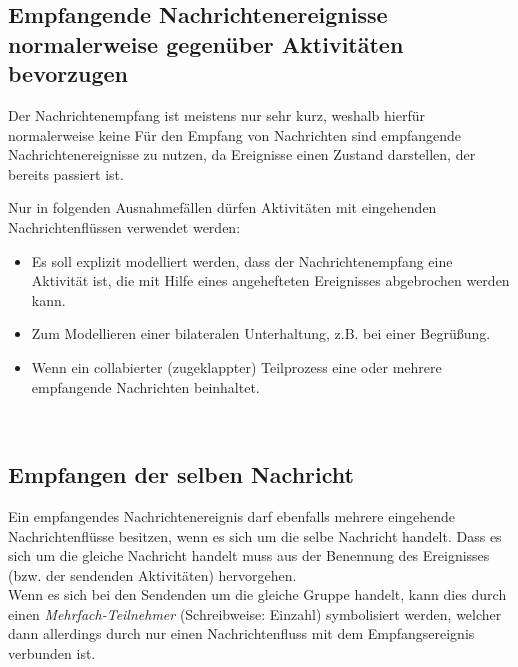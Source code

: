 \documentclass[12pt,report]{snetTeaching}
\begin{document}
\begin{Rahmen}
	\hfill
\end{Rahmen}


\clearpage
\subsection{Empfangende Nachrichtenereignisse normalerweise gegenüber Aktivitäten bevorzugen}
\label{konv:receivingMessageEvents}

Der Nachrichtenempfang ist meistens nur sehr kurz, weshalb hierfür normalerweise keine 
Für den Empfang von Nachrichten sind empfangende Nachrichtenereignisse zu nutzen, da Ereignisse einen Zustand darstellen, der bereits passiert ist.


Nur in folgenden Ausnahmefällen dürfen Aktivitäten mit eingehenden Nachrichtenflüssen verwendet werden:
\begin{itemize}
	\item Es soll explizit modelliert werden, dass der Nachrichtenempfang eine Aktivität ist, die mit Hilfe eines angehefteten Ereignisses abgebrochen werden kann.
	\item Zum Modellieren einer bilateralen Unterhaltung, z.B. bei einer Begrüßung.
	\item Wenn ein collabierter (zugeklappter) Teilprozess eine oder mehrere empfangende Nachrichten beinhaltet. 
\end{itemize}

\begin{Rahmen}
	\hfill
	\\
	\hfill
\end{Rahmen}





\clearpage
\subsection{Empfangen der selben Nachricht}


Ein empfangendes Nachrichtenereignis darf ebenfalls mehrere eingehende Nachrichtenflüsse besitzen, wenn es sich um die selbe Nachricht handelt.
Dass es sich um die gleiche Nachricht handelt muss aus der Benennung des Ereignisses (bzw. der sendenden Aktivitäten) hervorgehen.\\
Wenn es sich bei den Sendenden um die gleiche Gruppe handelt, kann dies durch einen \emph{Mehrfach-Teilnehmer} (Schreibweise: Einzahl) symbolisiert werden, welcher dann allerdings durch nur einen Nachrichtenfluss mit dem Empfangsereignis verbunden ist.
\end{document}
